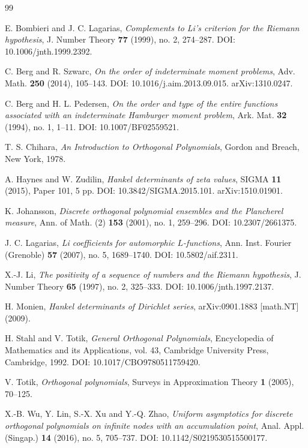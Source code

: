 \documentclass[11pt]{amsart}
\numberwithin{equation}{section}
\theoremstyle{plain}
\theoremstyle{definition}
\theoremstyle{remark}
\begin{document}
\begin{thebibliography}{99}

E. Bombieri and J. C. Lagarias,
\emph{Complements to Li's criterion for the Riemann hypothesis},
J. Number Theory \textbf{77} (1999), no. 2, 274--287.
DOI: 10.1006/jnth.1999.2392.

C. Berg and R. Szwarc,
\emph{On the order of indeterminate moment problems},
Adv. Math. \textbf{250} (2014), 105--143.
DOI: 10.1016/j.aim.2013.09.015. arXiv:1310.0247.

C. Berg and H. L. Pedersen,
\emph{On the order and type of the entire functions associated with an indeterminate Hamburger
moment problem},
Ark. Mat. \textbf{32} (1994), no. 1, 1--11.
DOI: 10.1007/BF02559521.

T. S. Chihara,
\emph{An Introduction to Orthogonal Polynomials},
Gordon and Breach, New York, 1978.

A. Haynes and W. Zudilin,
\emph{Hankel determinants of zeta values},
SIGMA \textbf{11} (2015), Paper 101, 5 pp.
DOI: 10.3842/SIGMA.2015.101. arXiv:1510.01901.

K. Johansson,
\emph{Discrete orthogonal polynomial ensembles and the Plancherel measure},
Ann. of Math. (2) \textbf{153} (2001), no. 1, 259--296.
DOI: 10.2307/2661375.

J. C. Lagarias,
\emph{Li coefficients for automorphic $L$-functions},
Ann. Inst. Fourier (Grenoble) \textbf{57} (2007), no. 5, 1689--1740.
DOI: 10.5802/aif.2311.

X.-J. Li,
\emph{The positivity of a sequence of numbers and the Riemann hypothesis},
J. Number Theory \textbf{65} (1997), no. 2, 325--333.
DOI: 10.1006/jnth.1997.2137.

H. Monien,
\emph{Hankel determinants of Dirichlet series},
arXiv:0901.1883 [math.NT] (2009).

H. Stahl and V. Totik,
\emph{General Orthogonal Polynomials},
Encyclopedia of Mathematics and its Applications, vol. 43,
Cambridge University Press, Cambridge, 1992.
DOI: 10.1017/CBO9780511759420.

V. Totik,
\emph{Orthogonal polynomials},
Surveys in Approximation Theory \textbf{1} (2005), 70--125.

X.-B. Wu, Y. Lin, S.-X. Xu and Y.-Q. Zhao,
\emph{Uniform asymptotics for discrete orthogonal polynomials on infinite nodes with an
accumulation point},
Anal. Appl. (Singap.) \textbf{14} (2016), no. 5, 705--737.
DOI: 10.1142/S0219530515500177.

\end{thebibliography}
\end{document}
